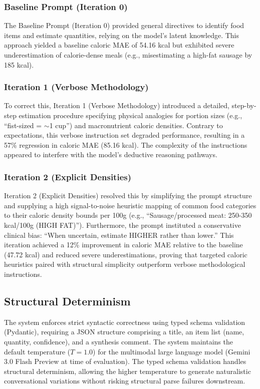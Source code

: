 \subsubsection{Baseline Prompt (Iteration 0)}
The Baseline Prompt (Iteration 0) provided general directives to identify food items and estimate quantities, relying on the model's latent knowledge. This approach yielded a baseline caloric MAE of 54.16 kcal but exhibited severe underestimation of calorie-dense meals (e.g., misestimating a high-fat sausage by 185 kcal).

\subsubsection{Iteration 1 (Verbose Methodology)}
To correct this, Iteration 1 (Verbose Methodology) introduced a detailed, step-by-step estimation procedure specifying physical analogies for portion sizes (e.g., ``fist-sized = $\sim$1 cup'') and macronutrient caloric densities. Contrary to expectations, this verbose instruction set degraded performance, resulting in a 57\% regression in caloric MAE (85.16 kcal). The complexity of the instructions appeared to interfere with the model's deductive reasoning pathways.

\subsubsection{Iteration 2 (Explicit Densities)}
Iteration 2 (Explicit Densities) resolved this by simplifying the prompt structure and supplying a high signal-to-noise heuristic mapping of common food categories to their caloric density bounds per 100g (e.g., ``Sausage/processed meat: 250-350 kcal/100g (HIGH FAT)''). Furthermore, the prompt instituted a conservative clinical bias: ``When uncertain, estimate HIGHER rather than lower.'' This iteration achieved a 12\% improvement in caloric MAE relative to the baseline (47.72 kcal) and reduced severe underestimations, proving that targeted caloric heuristics paired with structural simplicity outperform verbose methodological instructions.

\subsection{Structural Determinism}

The system enforces strict syntactic correctness using typed schema validation (Pydantic), requiring a JSON structure comprising a title, an item list (name, quantity, confidence), and a synthesis comment. The system maintains the default temperature ($T=1.0$) for the multimodal large language model (Gemini 3.0 Flash Preview at time of evaluation). The typed schema validation handles structural determinism, allowing the higher temperature to generate naturalistic conversational variations without risking structural parse failures downstream.

